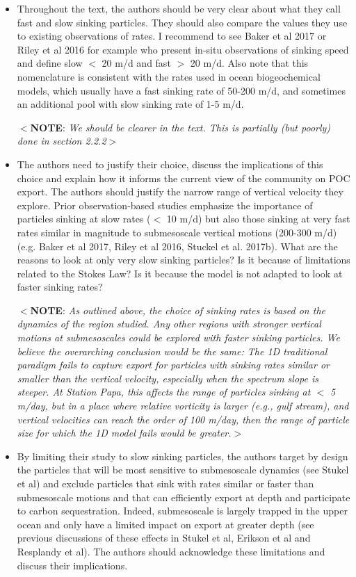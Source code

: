 \documentclass[12pt,letter]{article}
\newcommand{\note}[1]{\color{red}$<$\textbf{NOTE}: \textit{#1}$>$\color{black}}
\begin{document}
\begin{itemize}
	\item Throughout the text, the authors should be very clear about what they call fast and slow sinking particles. They should also compare the values they use to existing observations of rates. I recommend to see Baker et al 2017 or Riley et al 2016 for example who present in-situ observations of sinking speed and define slow $<$ 20 m/d and fast $>$ 20 m/d. Also note that this nomenclature is consistent with the rates used in ocean biogeochemical models, which usually have a fast sinking rate of 50-200 m/d, and sometimes an additional pool with slow sinking rate of 1-5 m/d. 
	
	\note{We should be clearer in the text. This is partially (but poorly) done in section 2.2.2}
	
	\item The authors need to justify their choice, discuss the implications of this choice and explain how it informs the current view of the community on POC export. The authors should justify the narrow range of vertical velocity they explore. Prior observation-based studies emphasize the importance of particles sinking at slow rates ($<$ 10 m/d) but also those sinking at very fast rates similar in magnitude to submesoscale vertical motions (200-300 m/d) (e.g. Baker et al 2017, Riley et al 2016, Stuckel et al. 2017b). What are the reasons to look at only very slow sinking particles? Is it because of limitations related to the Stokes Law? Is it because the model is not adapted to look at faster sinking rates?
	
	\note{As outlined above, the choice of sinking rates is based on the dynamics of the region studied. Any other regions with stronger vertical motions at submesoscales could be explored with faster sinking particles. We believe the overarching conclusion would be the same: The 1D traditional paradigm fails to capture export for particles with sinking rates similar or smaller than the vertical velocity, especially when the spectrum slope is steeper. At Station Papa, this affects the range of particles sinking at $<$ 5 m/day, but in a place where relative vorticity is larger (e.g., gulf stream), and vertical velocities can reach the order of 100 m/day, then the range of particle size for which the 1D model fails would be greater.}
	
	\item By limiting their study to slow sinking particles, the authors target by design the particles that will be most sensitive to submesoscale dynamics (see Stukel et al) and exclude particles that sink with rates similar or faster than submesoscale motions and that can efficiently export at depth and participate to carbon sequestration. Indeed, submesoscale is largely trapped in the upper ocean and only have a limited impact on export at greater depth (see previous discussions of these effects in Stukel et al, Erikson et al and Resplandy et al). The authors should acknowledge these limitations and discuss their implications.
	

\end{itemize}
\end{document}
